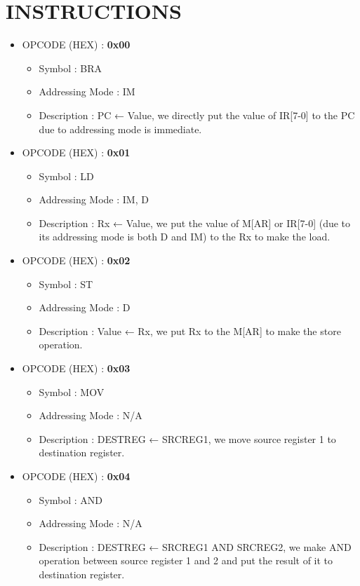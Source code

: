 \documentclass[pdftex,12pt,a4paper]{article}
\begin{document}
\section{INSTRUCTIONS}
\begin{itemize}
    \item OPCODE (HEX) : \textbf{0x00}
    \begin{itemize}
        \item Symbol : BRA
        \item Addressing Mode : IM 
        \item Description : PC ← Value, we directly put the value of IR[7-0] to the PC due to addressing mode is immediate.
    \end{itemize}
    \item OPCODE (HEX) : \textbf{0x01}
        \begin{itemize}
            \item Symbol : LD
            \item Addressing Mode : IM, D
            \item Description : Rx ← Value, we put the value of M[AR] or IR[7-0] (due to its addressing mode is both D and IM) to the Rx to make the load.
        \end{itemize}
    \item OPCODE (HEX) : \textbf{0x02}
        \begin{itemize}
            \item Symbol : ST
            \item Addressing Mode : D
            \item Description : Value ← Rx, we put Rx to the M[AR] to make the store operation.
        \end{itemize}    
    \item OPCODE (HEX) :  \textbf{0x03} 
        \begin{itemize}
            \item Symbol : MOV
            \item Addressing Mode : N/A
            \item Description : DESTREG ← SRCREG1, we move source register 1 to destination register.
        \end{itemize}    
    \item OPCODE (HEX) : \textbf{0x04} 
        \begin{itemize}
            \item Symbol : AND
            \item Addressing Mode : N/A
            \item Description : DESTREG ← SRCREG1 AND SRCREG2, we make AND operation between source register 1 and 2 and put the result of it to destination register.

\end{itemize}
\end{itemize}
\end{document}

